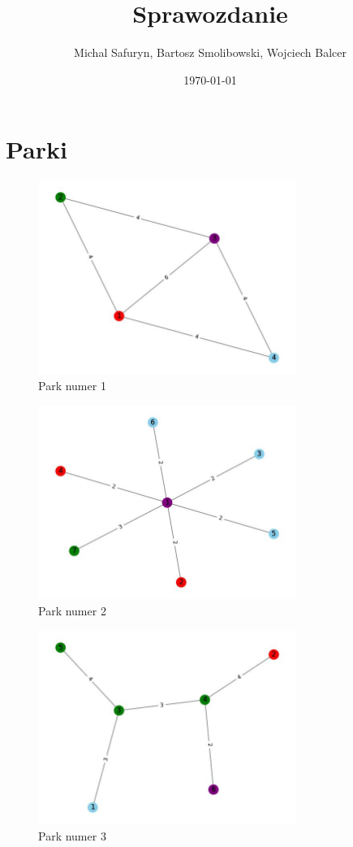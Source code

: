 \documentclass{article}
\title{Sprawozdanie}
\author{Michal Safuryn, Bartosz Smolibowski, Wojciech Balcer}
\date{\today}
\begin{document}
\maketitle
\section{Parki}
\begin{figure}[h!]
\centering
\includegraphics[width=0.75\textwidth]{1.jpg}
\caption{Park numer 1}
\end{figure}
\begin{figure}[h!]
\centering
\includegraphics[width=0.75\textwidth]{2.jpg}
\caption{Park numer 2}
\end{figure}
\begin{figure}[h!]
\centering
\includegraphics[width=0.75\textwidth]{3.jpg}
\caption{Park numer 3}
\end{figure}
\end{document}

